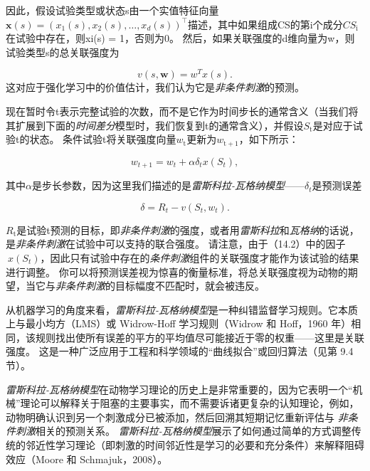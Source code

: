 因此，假设试验类型或状态s由一个实值特征向量$\mathbf{x}(s)=\left(x_{1}(s), x_{2}(s), \ldots, x_{d}(s)\right)^{\top}$描述，其中如果组成CS的第i个成分$CS_{\mathrm{i}}$在试验中存在，则xi(s) = 1，否则为0。
然后，如果关联强度的d维向量为w，则试验类型s的总关联强度为

\begin{equation}\label{key}
	v(s, \textbf{w}) = 
	w^T x(s).
\end{equation}
这对应于强化学习中的价值估计，我们认为它是\textit{非条件刺激}的预测。

现在暂时令t表示完整试验的次数，而不是它作为时间步长的通常含义（当我们将其扩展到下面的\textit{时间差分}模型时，我们恢复到t的通常含义），并假设$S_{\mathrm{t}}$是对应于试验t的状态。
条件试验t将关联强度向量$w_{\mathrm{t}}$更新为$w_{\mathrm{t+1}}$，如下所示：

\begin{equation}\label{key}
	w_{t+1} = w_t + \alpha \delta_t x(S_t),
\end{equation}

其中$\alpha$是步长参数，因为这里我们描述的是\textit{雷斯科拉-瓦格纳模型}——$\delta_t $是预测误差

\begin{equation}\label{key}
	\delta = R_t - v (S_t, w_t).
\end{equation}


$R_{\mathrm{t}}$是试验t预测的目标，即\textit{非条件刺激}的强度，或者用\textit{雷斯科拉}和\textit{瓦格纳}的话说，是\textit{非条件刺激}在试验中可以支持的联合强度。
请注意，由于（14.2）中的因子$\ x(S_t)$，因此只有试验中存在的\textit{条件刺激}组件的关联强度才能作为该试验的结果进行调整。
你可以将预测误差视为惊喜的衡量标准，将总关联强度视为动物的期望，当它与\textit{非条件刺激}的目标幅度不匹配时，就会被违反。


从机器学习的角度来看，\textit{雷斯科拉-瓦格纳模型}是一种纠错监督学习规则。它本质上与最小均方（LMS）或 Widrow-Hoff 学习规则（Widrow 和 Hoff，1960 年）相同，该规则找出使所有误差的平方的平均值尽可能接近于零的权重——这里是关联强度。
这是一种广泛应用于工程和科学领域的“曲线拟合”或回归算法（见第 9.4 节）。




\textit{雷斯科拉-瓦格纳模型}在动物学习理论的历史上是非常重要的，因为它表明一个“机械”理论可以解释关于阻塞的主要事实，而不需要诉诸更复杂的认知理论，例如，动物明确认识到另一个刺激成分已被添加，然后回溯其短期记忆重新评估与 \textit{非条件刺激}相关的预测关系。
\textit{雷斯科拉-瓦格纳模型}展示了如何通过简单的方式调整传统的邻近性学习理论（即刺激的时间邻近性是学习的必要和充分条件）来解释阻碍效应（Moore 和 Schmajuk，2008）。


